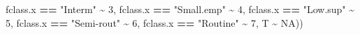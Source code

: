 \documentclass[
]{article}
\newenvironment{Shaded}{\begin{snugshade}}{\end{snugshade}}
\newcommand{\ConstantTok}[1]{\textcolor[rgb]{0.56,0.35,0.01}{#1}}
\newcommand{\DecValTok}[1]{\textcolor[rgb]{0.00,0.00,0.81}{#1}}
\newcommand{\NormalTok}[1]{#1}
\newcommand{\SpecialCharTok}[1]{\textcolor[rgb]{0.81,0.36,0.00}{\textbf{#1}}}
\newcommand{\StringTok}[1]{\textcolor[rgb]{0.31,0.60,0.02}{#1}}
\begin{document}
\begin{Shaded}
\begin{Highlighting}[]
\NormalTok{                               fclass.x }\SpecialCharTok{==} \StringTok{"Interm"} \SpecialCharTok{\textasciitilde{}} \DecValTok{3}\NormalTok{,}
\NormalTok{                               fclass.x }\SpecialCharTok{==} \StringTok{"Small.emp"} \SpecialCharTok{\textasciitilde{}} \DecValTok{4}\NormalTok{,}
\NormalTok{                               fclass.x }\SpecialCharTok{==} \StringTok{"Low.sup"} \SpecialCharTok{\textasciitilde{}} \DecValTok{5}\NormalTok{,}
\NormalTok{                               fclass.x }\SpecialCharTok{==} \StringTok{"Semi{-}rout"} \SpecialCharTok{\textasciitilde{}} \DecValTok{6}\NormalTok{,}
\NormalTok{                               fclass.x }\SpecialCharTok{==} \StringTok{"Routine"} \SpecialCharTok{\textasciitilde{}} \DecValTok{7}\NormalTok{,}
\NormalTok{                               T }\SpecialCharTok{\textasciitilde{}} \ConstantTok{NA}\NormalTok{))}
\end{Highlighting}
\end{Shaded}
\end{document}
